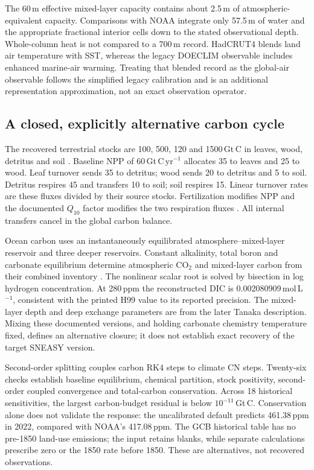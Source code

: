 The 60\,m effective mixed-layer capacity contains about 2.5\,m of
atmospheric-equivalent capacity. Comparisons with NOAA integrate only 57.5\,m
of water and the appropriate fractional interior cells down to the stated
observational depth. Whole-column heat is not compared to a 700\,m record.
HadCRUT4 blends land air temperature with SST, whereas the legacy DOECLIM
observable includes enhanced marine-air warming. Treating that blended record
as the global-air observable follows the simplified legacy calibration and is
an additional representation approximation, not an exact observation operator.

\subsection{A closed, explicitly alternative carbon cycle}

The recovered terrestrial stocks are 100, 500, 120 and 1500\,Gt\,C in leaves,
wood, detritus and soil \cite{siegenthaler}. Baseline NPP of 60\,Gt\,C\,yr$^{-1}$
allocates 35 to leaves and 25 to wood. Leaf turnover sends 35 to detritus;
wood sends 20 to detritus and 5 to soil. Detritus respires 45 and transfers 10
to soil; soil respires 15. Linear turnover rates are these fluxes divided by
their source stocks. Fertilization modifies NPP and the documented $Q_{10}$
factor modifies the two respiration fluxes \cite{ricciuto}. All internal
transfers cancel in the global carbon balance.

Ocean carbon uses an instantaneously equilibrated atmosphere--mixed-layer
reservoir and three deeper reservoirs. Constant alkalinity, total boron and
carbonate equilibrium determine atmospheric CO$_2$ and mixed-layer carbon from
their combined inventory \cite{hooss1999}. The nonlinear scalar root is solved
by bisection in log hydrogen concentration. At 280\,ppm the reconstructed DIC
is 0.002080909\,mol\,L$^{-1}$, consistent with the printed H99 value to its
reported precision. The mixed-layer depth and deep exchange parameters are
from the later Tanaka description. Mixing these documented versions, and
holding carbonate chemistry temperature fixed, defines an alternative closure;
it does not establish exact recovery of the target SNEASY version.

Second-order splitting couples carbon RK4 steps to climate CN steps. Twenty-six
checks establish baseline equilibrium, chemical partition, stock positivity,
second-order coupled convergence and total-carbon conservation. Across 18
historical sensitivities, the largest carbon-budget residual is below
$10^{-11}$\,Gt\,C. Conservation alone does not validate the response: the
uncalibrated default predicts 461.38\,ppm in 2022, compared with NOAA's
417.08\,ppm. The GCB historical table has no pre-1850 land-use emissions; the
input retains blanks, while separate calculations prescribe zero or the 1850
rate before 1850. These are alternatives, not recovered observations.

